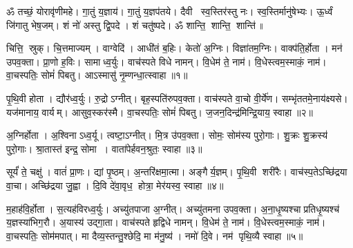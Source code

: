 
\setcounter{anuvakam}{0}
ॐ तच्छं॒ योरावृ॑णीमहे। गा॒तुं य॒ज्ञाय॑। गा॒तुं य॒ज्ञप॑तये। 
दैवी स्व॒स्तिर॑स्तु नः। स्व॒स्तिर्मानु॑षेभ्यः। ऊ॒र्ध्वं जि॑गातु भेष॒जम्। 
शं नो॑ अस्तु द्वि॒पदे। शं चतु॑ष्पदे। ॐ शान्ति॒ शान्ति॒ शान्ति॑॥

चित्ति॒ स्रुक्। चि॒त्तमाज्यम्। वाग्वेदि॑। आधी॑तं ब॒\ar{}हिः। केतो॑ अ॒ग्निः। विज्ञा॑तम॒ग्निः। वाक्प॑ति॒र्\mbox{}होता। मन॑ उपव॒क्ता। प्रा॒णो ह॒विः। सामाध्व॒र्युः। वाच॑स्पते विधे नामन्। वि॒धेम॑ ते॒ नाम॑। वि॒धेस्त्वम॒स्माकं॒ नाम॑। वा॒चस्पतिः॒ सोमं॑ पिबतु। आऽस्मासु॑ नृ॒म्णन्धा॒त्स्वाहा॥१॥
\anuvakamend[अ॒ध्व॒र्युः पञ्च॑ च]

पृ॒थि॒वी होता। द्यौर॑ध्व॒र्युः। रु॒द्रोऽग्नीत्। बृह॒स्पति॑रुपव॒क्ता। वाच॑स्पते वा॒चो वी॒र्ये॑ण। सम्भृ॑ततमे॒नाय॑क्ष्यसे। यज॑मानाय॒ वार्यम्। आसुव॒स्कर॑स्मै। वा॒चस्पतिः॒ सोमं॑ पिबतु। ज॒जन॒दिन्द्र॑\-मिन्द्रि॒याय॒ स्वाहा॥२॥%
\anuvakamend[पृ॒थि॒वी होता॒ दश॑]

अ॒ग्निर्\mbox{}होता। अ॒श्विनाऽध्व॒र्यू। त्वष्टा॒ऽग्नीत्। मि॒त्र उ॑पव॒क्ता। सोमः॒ सोम॑स्य पुरो॒गाः। शु॒क्रः  शु॒क्रस्य॑ पुरो॒गाः। श्रा॒तास्त॑ इन्द्र॒ सोमा। वाता॑पेर्\mbox{}हवन॒श्रुतः॒ स्वाहा॥३॥%
\anuvakamend[अ॒ग्निर्होता॒ऽष्टौ]

सूर्यं॑ ते॒ चक्षु॑। वातं॑ प्रा॒णः। द्यां पृ॒ष्ठम्। अ॒न्तरि॑क्षमा॒त्मा। अङ्गैर्\mbox{}य॒ज्ञम्। पृ॒थि॒वी शरी॑रैः। वाच॑स्प॒तेऽच्छि॑द्रया वा॒चा। अच्छि॑द्रया जु॒ह्वा। दि॒वि दे॑वा॒वृध॒ होत्रा॒ मेर॑यस्व॒ स्वाहा॥४॥
\anuvakamend[सूर्यं॑ ते॒ नव॑]

म॒हाह॑वि॒र्\mbox{}होता। स॒त्यह॑विरध्व॒र्युः। अच्यु॑तपाजा अ॒ग्नीत्। अच्यु॑तमना उपव॒क्ता। अ॒ना॒धृ॒ष्यश्चाप्रतिधृ॒ष्यश्च॑ य॒ज्ञस्या॑भिग॒रौ। अ॒यास्य॑ उद्गा॒ता। वाच॑स्पते हृद्विधे नामन्। वि॒धेम॑ ते॒ नाम॑। वि॒धेस्त्वम॒स्माकं॒ नाम॑। वा॒चस्पतिः॒ सोम॑मपात्। मा दैव्य॒स्तन्तु॒श्छेदि॒ मा म॑नु॒ष्य॑। नमो॑ दि॒वे। नम॑ पृथि॒व्यै स्वाहा॥५॥%
\anuvakamend[अ॒पा॒त्त्रीणि॑ च]

